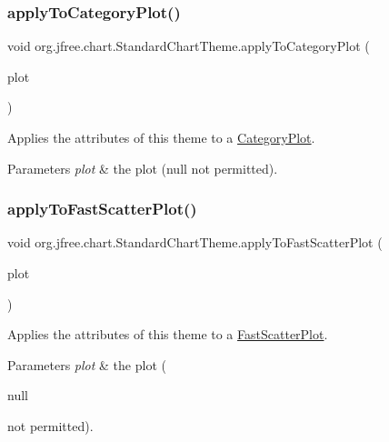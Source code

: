 \subsubsection{\texorpdfstring{apply\+To\+Category\+Plot()}{applyToCategoryPlot()}}
{\footnotesize\ttfamily void org.\+jfree.\+chart.\+Standard\+Chart\+Theme.\+apply\+To\+Category\+Plot (\begin{DoxyParamCaption}\item[{\mbox{\hyperlink{classorg_1_1jfree_1_1chart_1_1plot_1_1_category_plot}{Category\+Plot}}}]{plot }\end{DoxyParamCaption})\hspace{0.3cm}{\ttfamily [protected]}}

Applies the attributes of this theme to a \mbox{\hyperlink{}{Category\+Plot}}.


\begin{DoxyParams}{Parameters}
{\em plot} & the plot ({\ttfamily null} not permitted). \\
\hline
\end{DoxyParams}
\mbox{\label{classorg_1_1jfree_1_1chart_1_1_standard_chart_theme_ad1c3878856b80553d73a75689d7f3bc2}} 
\subsubsection{\texorpdfstring{apply\+To\+Fast\+Scatter\+Plot()}{applyToFastScatterPlot()}}
{\footnotesize\ttfamily void org.\+jfree.\+chart.\+Standard\+Chart\+Theme.\+apply\+To\+Fast\+Scatter\+Plot (\begin{DoxyParamCaption}\item[{\mbox{\hyperlink{classorg_1_1jfree_1_1chart_1_1plot_1_1_fast_scatter_plot}{Fast\+Scatter\+Plot}}}]{plot }\end{DoxyParamCaption})\hspace{0.3cm}{\ttfamily [protected]}}

Applies the attributes of this theme to a \mbox{\hyperlink{}{Fast\+Scatter\+Plot}}.


\begin{DoxyParams}{Parameters}
{\em plot} & the plot (
\begin{DoxyCode}
null 
\end{DoxyCode}
 not permitted). \\
\hline
\end{DoxyParams}
\mbox{\label{classorg_1_1jfree_1_1chart_1_1_standard_chart_theme_ace0e9b68253031b41f6084f965924264}} 
